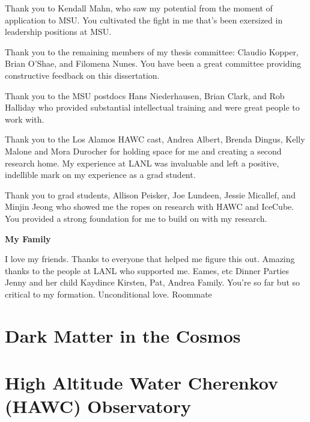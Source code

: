 \documentclass[PhD]{msu-thesis}
\begin{document}
Thank you to Kendall Mahn, who saw my potential from the moment of application to MSU.
You cultivated the fight in me that's been exersized in leadership positions at MSU.

Thank you to the remaining members of my thesis committee: Claudio Kopper, Brian O'Shae, and Filomena Nunes.
You have been a great committee providing constructive feedback on this dissertation.

Thank you to the MSU postdocs Hans Niederhausen, Brian Clark, and Rob Halliday who provided substantial intellectual training and were great people to work with.

Thank you to the Los Alamos HAWC cast, Andrea Albert, Brenda Dingus, Kelly Malone and Mora Durocher for holding space for me and creating a second research home.
My experience at LANL was invaluable and left a positive, indellible mark on my experience as a grad student.

Thank you to grad students, Allison Peisker, Joe Lundeen, Jessie Micallef, and Minjin Jeong who showed me the ropes on research with HAWC and IceCube.
You provided a strong foundation for me to build on with my research.

\textbf{My Family}

I love my friends.
Thanks to everyone that helped me figure this out.
Amazing thanks to the people at LANL who supported me.
Eames, etc
Dinner Parties
Jenny and her child Kaydince
Kirsten, Pat, Andrea
Family. You're so far but so critical to my formation. Unconditional love.
Roommate

\clearpage
\SingleSpacing
\tableofcontents*
\clearpage

\listoftables
\clearpage

\listoffigures
\mainmatter

\chapter{Dark Matter in the Cosmos\label{sec:dm_cosmos}}


\chapter{High Altitude Water Cherenkov (HAWC) Observatory\label{sec:hawc}}

\end{document}
